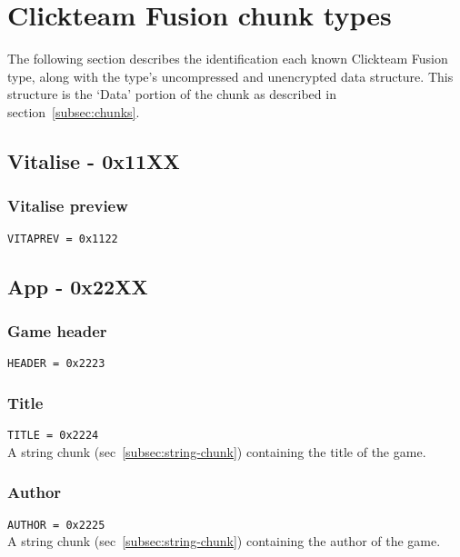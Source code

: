 \documentclass{article}
\begin{document}

\section[CTF chunks]{Clickteam Fusion chunk types}
\label{sec:ctf-chunks}

The following section describes the identification each known Clickteam Fusion
type, along with the type's uncompressed and unencrypted data structure.
This structure is the `Data' portion of the chunk as described in
section~\ref{subsec:chunks}.

\subsection{Vitalise - 0x11XX}

\subsubsection{Vitalise preview}
\verb|VITAPREV = 0x1122|

\subsection{App - 0x22XX}

\subsubsection{Game header}
\verb|HEADER = 0x2223|

\subsubsection{Title}
\verb|TITLE = 0x2224|
\\
A string chunk (sec~\ref{subsec:string-chunk}) containing the title of the
game.

\subsubsection{Author}
\verb|AUTHOR = 0x2225|
\\
A string chunk (sec~\ref{subsec:string-chunk}) containing the author of the
game.
\end{document}
